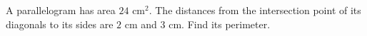 A parallelogram has area $24\text{ cm}^2$. The distances from the intersection point of its diagonals to its sides are $2$ cm and $3$ cm. Find its perimeter.
